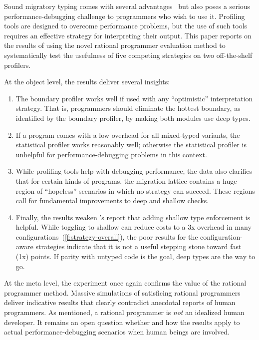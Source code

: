 

Sound migratory typing comes with several advantages~\cite{lgfd-icfp-2021} 
but also poses a serious performance-debugging challenge to
programmers who wish to use it.
Profiling tools are designed to overcome performance problems, but the
use of such tools requires an effective strategy for interpreting their output.
This paper reports
on the results of using the novel rational programmer evaluation method to
systematically test the usefulness of five competing strategies on two
off-the-shelf profilers.

At the object level, the results deliver several insights:
\begin{enumerate}
  \item
    The boundary profiler works well if used with any ``optimistic''
    interpretation strategy. That is, programmers should eliminate the hottest
    boundary, as identified by the boundary profiler, by making both modules
    use deep types.

  \item
    If a program comes with a low overhead for all mixed-typed
    variants, the statistical profiler works reasonably well; otherwise the
    statistical profiler is unhelpful for performance-debugging problems in
    this context.

  \item
    While profiling tools help with debugging
    performance, the data also clarifies that for
    certain kinds of programs, the migration lattice contains a huge region
    of ``hopeless'' scenarios in which no strategy can succeed.
    These regions call for fundamental improvements to deep and shallow checks.

  \item
    Finally, the results weaken \citet{g-deep-shallow}'s report that
    adding shallow type enforcement is helpful.
    While toggling to shallow can reduce costs to a 3x overhead in many
    configurations~(\cref{f:strategy-overall}), the poor results for the
    configuration-aware strategies indicate that it is not a useful stepping
    stone toward fast (1x) points.
    If parity with untyped code is the goal, deep types are the way to go.
\end{enumerate}

At the meta level, the experiment once again confirms the value of the
rational programmer method. Massive simulations of satisficing rational
programmers deliver indicative results that clearly contradict anecdotal reports
of human programmers. As mentioned, a rational programmer is {\em not\/} an
idealized human developer. It remains an open question whether and how the
results apply to actual performance-debugging scenarios when human beings are
involved.


